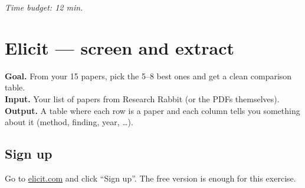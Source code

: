 \documentclass[11pt,a4paper]{article}
\begin{document}
\textit{Time budget: 12 min.}

\section{Elicit --- screen and extract}
\label{sec:elicit}

\begin{toolheader}
\textbf{Goal.} From your 15 papers, pick the 5--8 best ones and get a clean comparison table.\\
\textbf{Input.} Your list of papers from Research Rabbit (or the PDFs themselves).\\
\textbf{Output.} A table where each row is a paper and each column tells you something about it (method, finding, year, \dots).
\end{toolheader}

\subsection*{Sign up}
Go to \href{https://elicit.com/}{elicit.com} and click ``Sign up''. The free version is enough for this exercise.
\end{document}
